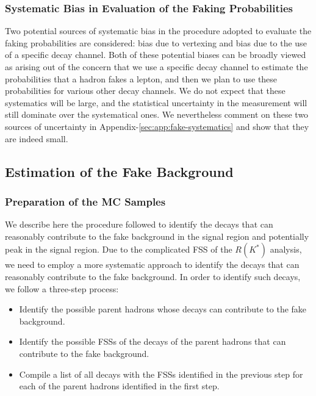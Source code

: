 \subsubsection{Systematic Bias in Evaluation of the Faking Probabilities}
Two potential sources of systematic bias in the procedure adopted to evaluate the faking probabilities are considered: bias due to vertexing and bias due to the use of a specific decay channel. %
Both of these potential biases can be broadly viewed as arising out of the concern that we use a specific decay channel to estimate the probabilities that a hadron fakes a lepton, and then we plan to use these probabilities for various other decay channels. %
We do not expect that these systematics will be large, and the statistical uncertainty in the measurement will still dominate over the systematical ones. %
We nevertheless comment on these two sources of uncertainty in Appendix-\ref{sec:app:fake-systematics} and show that they are indeed small. %
\subsection{Estimation of the Fake Background}
\label{sec:estimation-of-fake-background-in-signal-region}
\subsubsection{Preparation of the MC Samples}
\label{subsec:preparation-of-the-mc-samples}
We describe here the procedure followed to identify the decays that can reasonably contribute to the fake background in the signal region and potentially peak in the signal region. %
Due to the complicated FSS of the $R(K^\ast)$ analysis, we need to employ a more systematic approach to identify the decays that can reasonably contribute to the fake background. %
In order to identify such decays, we follow a three-step process:
\begin{itemize}
    \item Identify the possible parent hadrons whose decays can contribute to the fake background.
    \item Identify the possible FSSs of the decays of the parent hadrons that can contribute to the fake background.
    \item Compile a list of all decays with the FSSs identified in the previous step for each of the parent hadrons identified in the first step.
\end{itemize}
